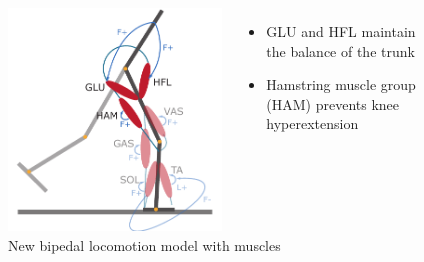 \documentclass[10pt]{beamer}
\begin{document}
\begin{frame}
\begin{figure}
\begin{overprint}
				\begin{columns}
					\begin{column}{.5\textwidth}
						\includegraphics[height=.5\textheight]{images/new_model/stance/muscle_vas_sol_gas_ta_ham_glu_hfl_floor.pdf} 
						\caption{New bipedal locomotion model with muscles}
					\end{column}
					\begin{column}{.5\textwidth}
						\begin{itemize}
							\item GLU and HFL maintain the balance of the trunk  \\ [1em]
							\item Hamstring muscle group (HAM) prevents knee hyperextension
						\end{itemize}
					\end{column}
				\end{columns}	
			\end{overprint}			
		\end{figure}
		
	\end{frame}
	
\end{document}
